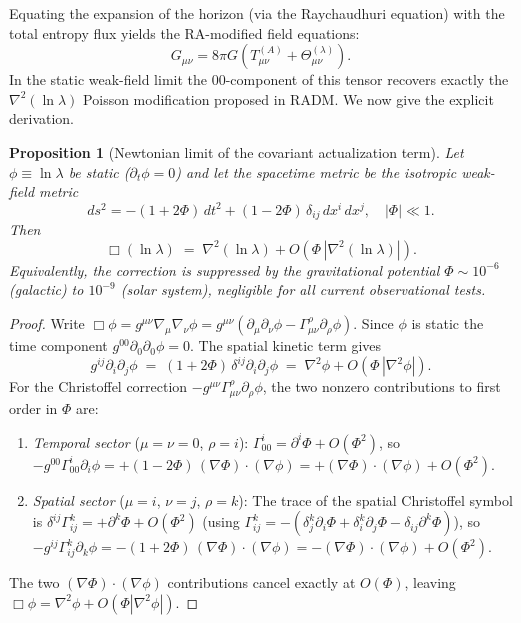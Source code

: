 \documentclass[11pt,a4paper]{article}
\theoremstyle{plain}
\newtheorem{proposition}[theorem]{Proposition}
\theoremstyle{definition}
\theoremstyle{remark}
\begin{document}
\begin{description}
Equating the expansion of the horizon (via the Raychaudhuri equation) with the
total entropy flux yields the RA-modified field equations:
\begin{equation}
  G_{\mu\nu} = 8\pi G\!\left(T_{\mu\nu}^{(A)}
    + \Theta_{\mu\nu}^{(\lambda)}\right).
  \label{eq:RA_field_eqs}
\end{equation}
In the static weak-field limit the $00$-component of this tensor recovers
exactly the $\nabla^2(\ln\lambda)$ Poisson modification proposed in RADM.
We now give the explicit derivation.

\begin{proposition}[Newtonian limit of the covariant actualization term]
\label{prop:newtonian_limit}
Let $\phi \equiv \ln\lambda$ be static ($\partial_t\phi = 0$) and let the
spacetime metric be the isotropic weak-field metric
\begin{equation}
  ds^2 = -(1+2\Phi)\,dt^2 + (1-2\Phi)\,\delta_{ij}\,dx^i\,dx^j,
  \quad |\Phi| \ll 1.
\end{equation}
Then
\begin{equation}
  \Box(\ln\lambda) \;=\; \nabla^2(\ln\lambda) + O\!\left(\Phi\,|\nabla^2(\ln\lambda)|\right).
  \label{eq:box_limit}
\end{equation}
Equivalently, the correction is suppressed by the gravitational potential
$\Phi \sim 10^{-6}$ (galactic) to $10^{-9}$ (solar system), negligible
for all current observational tests.
\end{proposition}

\begin{proof}
Write $\Box\phi = g^{\mu\nu}\nabla_\mu\nabla_\nu\phi
= g^{\mu\nu}(\partial_\mu\partial_\nu\phi - \Gamma^\rho_{\mu\nu}\partial_\rho\phi)$.
Since $\phi$ is static the time component $g^{00}\partial_0\partial_0\phi = 0$.
The spatial kinetic term gives
\[
  g^{ij}\partial_i\partial_j\phi \;=\; (1+2\Phi)\,\delta^{ij}\partial_i\partial_j\phi
  \;=\; \nabla^2\phi + O(\Phi\,|\nabla^2\phi|).
\]
For the Christoffel correction $-g^{\mu\nu}\Gamma^\rho_{\mu\nu}\partial_\rho\phi$,
the two nonzero contributions to first order in $\Phi$ are:
\begin{enumerate}[noitemsep]
  \item \emph{Temporal sector} ($\mu=\nu=0$, $\rho=i$):
  $\Gamma^i_{00} = \partial^i\Phi + O(\Phi^2)$, so
  $-g^{00}\Gamma^i_{00}\partial_i\phi = +(1-2\Phi)\,(\nabla\Phi)\cdot(\nabla\phi)
  = +(\nabla\Phi)\cdot(\nabla\phi) + O(\Phi^2)$.
  \item \emph{Spatial sector} ($\mu=i$, $\nu=j$, $\rho=k$):
  The trace of the spatial Christoffel symbol is
  $\delta^{ij}\Gamma^k_{ij} = +\partial^k\Phi + O(\Phi^2)$
  (using $\Gamma^k_{ij} = -({\delta^k_j\partial_i\Phi + \delta^k_i\partial_j\Phi
  - \delta_{ij}\partial^k\Phi})$), so
  $-g^{ij}\Gamma^k_{ij}\partial_k\phi = -(1+2\Phi)\,(\nabla\Phi)\cdot(\nabla\phi)
  = -(\nabla\Phi)\cdot(\nabla\phi) + O(\Phi^2)$.
\end{enumerate}
The two $(\nabla\Phi)\cdot(\nabla\phi)$ contributions cancel exactly at $O(\Phi)$,
leaving $\Box\phi = \nabla^2\phi + O(\Phi|\nabla^2\phi|)$.


\end{proof}
\end{description}
\end{document}
